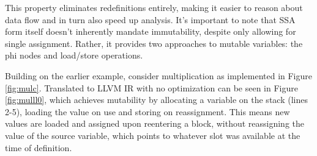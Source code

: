 \documentclass{article}
\begin{document}
This property eliminates redefinitions entirely, making it easier to reason about data flow and in turn also speed up analysis.
It's important to note that SSA form itself doesn't inherently mandate immutability, despite only allowing for single assignment.
Rather, it provides two approaches to mutable variables: the phi nodes and load/store operations. 

Building on the earlier example, consider multiplication as  implemented in Figure \ref{fig:mulc}. Translated to LLVM IR with no optimization  can be seen in Figure \ref{fig:mulll0}, which achieves mutability by allocating a variable on the stack (lines 2-5), loading the value on use and storing on reassignment.
This means new values are loaded and assigned upon reentering a block, without reassigning the value of the source variable, which points to whatever slot was available at the time of definition.
\end{document}
